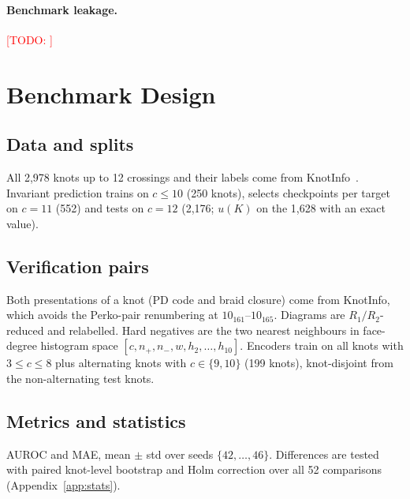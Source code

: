 \documentclass{article}
\newcommand{\todo}[1]{\textcolor{red}{[TODO: #1]}}
\begin{document}
\paragraph{Benchmark leakage.} \todo{}

\section{Benchmark Design}\label{sec:benchmark}
\subsection{Data and splits}
All 2{,}978 knots up to 12 crossings and their labels come from
KnotInfo~\cite{knotinfo}. Invariant prediction trains on $c{\le}10$ (250
knots), selects checkpoints per target on $c{=}11$ (552) and tests on $c{=}12$
(2{,}176; $u(K)$ on the 1{,}628 with an exact value).
\subsection{Verification pairs}
Both presentations of a knot (PD code and braid closure) come from KnotInfo,
which avoids the Perko-pair renumbering at $10_{161}$--$10_{165}$. Diagrams are
$R_1/R_2$-reduced and relabelled. Hard negatives are the two nearest
neighbours in face-degree histogram space $[c,n_+,n_-,w,h_2,\dots,h_{10}]$.
Encoders train on all knots with $3{\le}c{\le}8$ plus alternating knots with
$c\in\{9,10\}$ (199 knots), knot-disjoint from the non-alternating test knots.
\subsection{Metrics and statistics}
AUROC and MAE, mean $\pm$ std over seeds $\{42,\dots,46\}$. Differences are
tested with paired knot-level bootstrap and Holm correction over all 52
comparisons (Appendix~\ref{app:stats}).

\end{document}
